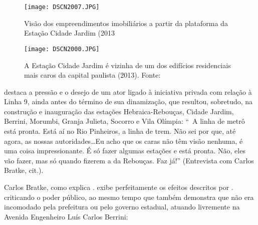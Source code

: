\documentclass[11pt,fleqn]{book} %
\begin{document}
\begin{landscape}
\begin{figure}[h!]
	\centering
	\caption{Visão dos empreendimentos imobiliários a partir da plataforma da Estação Cidade Jardim (2013} 
	\texttt{[image: DSCN2007.JPG]}
\end{figure}
\end{landscape}

\begin{landscape}
\begin{figure}[h!]
	\centering
	\caption{A Estação Cidade Jardim é vizinha de um dos edifícios residenciais mais caros da capital paulista (2013). Fonte: \cite{apecaro}} 
	\texttt{[image: DSCN2000.JPG]}
\end{figure}
\end{landscape}

\cite[p. 201]{Frugoli} destaca a pressão e o desejo de um ator ligado à iniciativa privada com relação à Linha 9, ainda antes do término de sua dinamização, que resultou, sobretudo, na construção e inauguração das estações Hebraica-Rebouças, Cidade Jardim, Berrini, Morumbi, Granja Julieta, Socorro e Vila Olímpia\cite[p. 38]{Ferreira}: ``\textemdash\ A linha de metrô está pronta. Está aí no Rio Pinheiros, a linha de trem. Não sei por que, até agora, as nossas autoridades\dots Eu acho que os caras não têm visão nenhuma, é uma coisa impressionante. É só fazer algumas estações e está pronta. Não, eles vão fazer, mas só quando fizerem a da Rebouças. Faz já!'' (Entrevista com Carlos Bratke, cit.).

Carlos Bratke, como explica \cite{Frugoli}. exibe perfeitamente os efeitos descritos por \cite{Acselrad}. criticando o poder público, ao mesmo tempo que também demonstra que não era incomodado pela prefeitura ou pelo governo estadual, atuando livremente na Avenida Engenheiro Luís Carlos Berrini:
\end{document}
